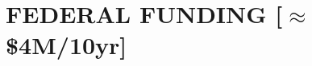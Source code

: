 \documentclass[paper=letter,fontsize=11pt]{scrartcl} %
\newcommand{\NewPart}[2]{\section*{\uppercase{#1} #2}}
\newcommand{\PaperEntry}[7]{
		\noindent #1, ``\href{#7}{#2}", \textit{#3} \textbf{#4}, #5 (#6).}
\newcommand{\ArxivEntry}[3]{
		\noindent #1, ``\href{http://arxiv.org/abs/#3}{#2}", \textit{{cond-mat/}#3}.}
\begin{document}
%
%
%
%






\NewPart{Federal Funding}{[$\approx$\$4M/10yr]}
\end{document}
